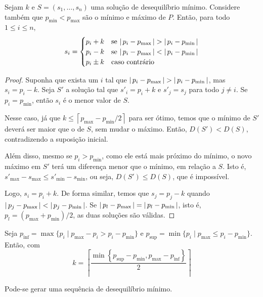 \def\pmin{\ensuremath{p_{\min}}\xspace}
\def\pmax{\ensuremath{p_{\max}}\xspace}
\def\pinf{\ensuremath{p_{\mathrm{inf}}}\xspace}
\def\psup{\ensuremath{p_{\mathrm{sup}}}\xspace}

\begin{theorem}
    Sejam $k$ e $S = (s_1, \ldots, s_n)$ uma solução de desequilíbrio mínimo. Considere também que $\pmin < \pmax$ são o mínimo e máximo de $P$. Então, para todo $1 \leq i \leq n$,
    \[
        s_i = \begin{cases}
            p_i + k & \text{se } \abs{p_i - \pmax} > \abs{p_i - \pmin} \\
            p_i - k & \text{se } \abs{p_i - \pmax} < \abs{p_i - \pmin} \\
            p_i \pm k & \text{caso contrário}
        \end{cases}
    \]
\end{theorem}

\begin{proof}
    Suponha que exista um $i$ tal que $\abs{p_i - \pmax} > \abs{p_i - \pmin}$, mas $s_i = p_i - k$. Seja $S'$ a solução tal que $s'_i = p_i + k$ e $s'_j = s_j$ para todo $j \ne i$. Se $p_i = \pmin$, então $s_i$ é o menor valor de $S$.

    Nesse caso, já que $k \leq \left\lceil \pmax - \pmin / 2 \right\rceil$ para ser ótimo, temos que o mínimo de $S'$ deverá ser maior que o de $S$, sem mudar o máximo. Então, $D(S') < D(S)$, contradizendo a suposição inicial.

    Além disso, mesmo se $p_i > \pmin$, como ele está mais próximo do mínimo, o novo máximo em $S'$ terá um diferença menor que o mínimo, em relação a $S$. Isto é, $s'_{\max} - s_{\max} \leq s'_{\min} - s_{\min}$, ou seja, $D(S') \leq D(S)$, que é impossível.

    Logo, $s_i = p_i + k$. De forma similar, temos que $s_j = p_j - k$ quando $\abs{p_j - \pmax} < \abs{p_j - \pmin}$. Se $\abs{p_l - \pmax} = \abs{p_l - \pmin}$, isto é, $p_l = (\pmax + \pmin) / 2$, as duas soluções são válidas.
\end{proof}

\itemdsep

\begin{theorem}
    Seja $\pinf = \max\{p_i \mid \pmax - p_i > p_i - \pmin\}$ e $\psup = \min\{p_i \mid \pmax \leq p_i - \pmin\}$. Então, com
    \[
        k = \left\lceil\frac{\min\left\{\psup - \pmin, \pmax - \pinf\right\}}{2}\right\rceil
    \]

    Pode-se gerar uma sequência de desequilíbrio mínimo.
\end{theorem}

